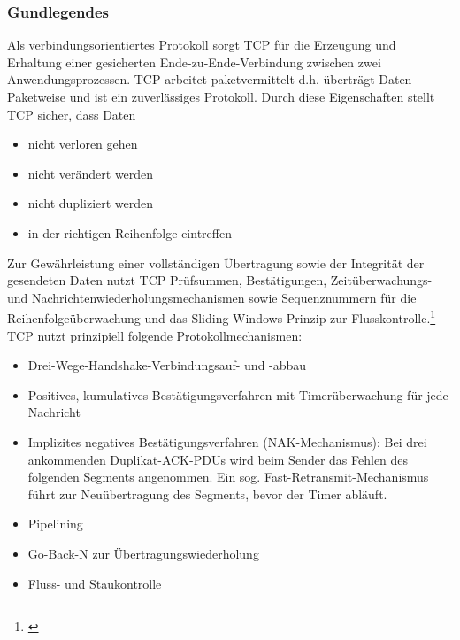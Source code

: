 \subsubsection{Gundlegendes}
Als verbindungsorientiertes Protokoll sorgt TCP für die Erzeugung und Erhaltung einer gesicherten Ende-zu-Ende-Verbindung zwischen zwei Anwendungsprozessen. TCP arbeitet paketvermittelt d.h. überträgt Daten Paketweise und ist ein zuverlässiges Protokoll. Durch diese Eigenschaften stellt TCP sicher, dass Daten
\begin{itemize}
	\item{nicht verloren gehen}
	\item{nicht verändert werden}
	\item{nicht dupliziert werden}
	\item{in der richtigen Reihenfolge eintreffen}
\end{itemize}
Zur Gewährleistung einer vollständigen Übertragung sowie der Integrität der gesendeten Daten nutzt TCP Prüfsummen, Bestätigungen, Zeitüberwachungs- und Nachrichtenwiederholungsmechanismen sowie Sequenznummern für die Reihenfolgeüberwachung und das Sliding Windows Prinzip zur Flusskontrolle.\footnote{\citep[vgl.][Grundkurs Datenkommunikation, Seite 190]{Mandl.GrundkursDatenkommunikation}\label{note44}}
\newline
TCP nutzt prinzipiell folgende Protokollmechanismen:
\begin{itemize}
	\item{Drei-Wege-Handshake-Verbindungsauf- und -abbau}
	\item{Positives, kumulatives Bestätigungsverfahren mit Timerüberwachung für jede Nachricht}
	\item{Implizites negatives Bestätigungsverfahren (NAK-Mechanismus): Bei drei ankommenden Duplikat-ACK-PDUs wird beim Sender das Fehlen des folgenden Segments angenommen. Ein sog. Fast-Retransmit-Mechanismus führt zur Neuübertragung des Segments, bevor der Timer abläuft.}
	\item{Pipelining}
	\item{Go-Back-N zur Übertragungswiederholung}
	\item{Fluss- und Staukontrolle}
\end{itemize}
